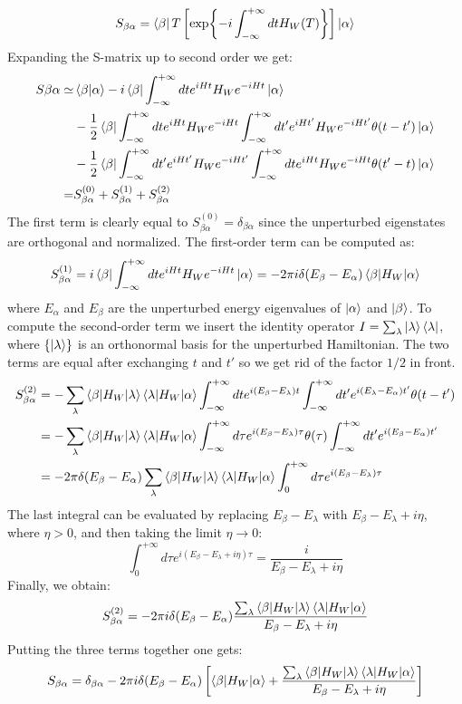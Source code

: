 \documentclass[../main.tex]{subfiles}
\begin{document}
\[
S_{\beta\alpha}=\bra{\beta}T\left[\exp{-i\int_{-\infty}^{+\infty}dtH_W(T)}\right]\ket{\alpha}
\]
Expanding the S-matrix up to second order we get:
\begin{align*}
S{\beta\alpha}\simeq&\braket{\beta|\alpha}-i\bra{\beta}\int_{-\infty}^{+\infty}dte^{iHt}H_We^{-iHt}\ket{\alpha}\\
&-\frac{1}{2}\bra{\beta}\int_{-\infty}^{+\infty}dte^{iHt}H_We^{-iHt}\int_{-\infty}^{+\infty}dt'e^{iHt'}H_We^{-iHt'}\theta(t-t')\ket{\alpha}\\
&-\frac{1}{2}\bra{\beta}\int_{-\infty}^{+\infty}dt'e^{iHt'}H_We^{-iHt'}\int_{-\infty}^{+\infty}dte^{iHt}H_We^{-iHt}\theta(t'-t)\ket{\alpha}\\
=&S_{\beta\alpha}^{(0)}+S_{\beta\alpha}^{(1)}+S_{\beta\alpha}^{(2)}
\end{align*}
The first term is clearly equal to $S_{\beta\alpha}^{(0)}=\delta_{\beta\alpha}$ since the unperturbed eigenstates are orthogonal and normalized. The first-order term can be computed as:
\[
S_{\beta\alpha}^{(1)}=i\bra{\beta}\int_{-\infty}^{+\infty}dte^{iHt}H_We^{-iHt}\ket{\alpha}=-2\pi i\delta(E_\beta-E_\alpha)\braket{\beta|H_W|\alpha}
\]
where $E_\alpha$ and $E_\beta$ are the unperturbed energy eigenvalues of $\ket{\alpha}$ and $\ket{\beta}$. To compute the second-order term we insert the identity operator $I=\sum_\lambda\ket{\lambda}\bra{\lambda}$, where $\{\ket{\lambda}\}$ is an orthonormal basis for the unperturbed Hamiltonian. The two terms are equal after exchanging $t$ and $t'$ so we get rid of the factor $1/2$ in front.
\begin{align*}
S_{\beta\alpha}^{(2)}&=-\sum_\lambda\braket{\beta|H_W|\lambda}\braket{\lambda|H_W|\alpha}\int_{-\infty}^{+\infty}dte^{i(E_\beta-E_\lambda)t}\int_{-\infty}^{+\infty}dt'e^{i(E_\lambda-E_\alpha)t'}\theta(t-t')\\
&=-\sum_\lambda\braket{\beta|H_W|\lambda}\braket{\lambda|H_W|\alpha}\int_{-\infty}^{+\infty}d\tau e^{i(E_\beta-E_\lambda)\tau}\theta(\tau)\int_{-\infty}^{+\infty}dt'e^{i(E_\beta-E_\alpha)t'}\\
&=-2\pi\delta(E_\beta-E_\alpha)\sum_\lambda\braket{\beta|H_W|\lambda}\braket{\lambda|H_W|\alpha}\int_0^{+\infty}d\tau e^{i(E_\beta-E_\lambda)\tau}
\end{align*}
The last integral can be evaluated by replacing $E_\beta-E_\lambda$ with $E_\beta-E_\lambda+i\eta$, where $\eta>0$, and then taking the limit $\eta\to0$:
\[
\int_0^{+\infty}d\tau e^{i(E_\beta-E_\lambda+i\eta)\tau}=\frac{i}{E_\beta-E_\lambda+i\eta}
\]
Finally, we obtain:
\[
S_{\beta\alpha}^{(2)}=-2\pi i\delta(E_\beta-E_\alpha)\frac{\sum_\lambda\braket{\beta|H_W|\lambda}\braket{\lambda|H_W|\alpha}}{E_\beta-E_\lambda+i\eta}
\]
Putting the three terms together one gets:
\[
S_{\beta\alpha}=\delta_{\beta\alpha}-2\pi i\delta(E_\beta-E_\alpha)\left[\braket{\beta|H_W|\alpha}+\frac{\sum_\lambda\braket{\beta|H_W|\lambda}\braket{\lambda|H_W|\alpha}}{E_\beta-E_\lambda+i\eta}\right]
\]
\end{document}
